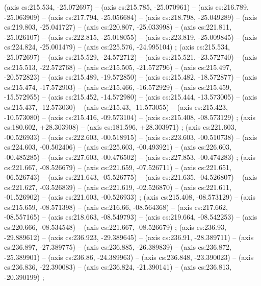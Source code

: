     (axis cs:215.534,    -25.072697) --  (axis cs:215.785,    -25.070961) --  (axis cs:216.789,    -25.063909) --  (axis cs:217.794,    -25.056684) --  (axis cs:218.798,    -25.049289) --  (axis cs:219.803,    -25.041727) --  (axis cs:220.807,    -25.033998) --  (axis cs:221.811,    -25.026107) --  (axis cs:222.815,    -25.018055) --  (axis cs:223.819,    -25.009845) --  (axis cs:224.824,    -25.001479) --  (axis cs:225.576,    -24.995104) ;
    (axis cs:215.534,    -25.072697) --  (axis cs:215.529,    -24.572712) --  (axis cs:215.521,    -23.572740) --  (axis cs:215.513,    -22.572768) --  (axis cs:215.505,    -21.572796) --  (axis cs:215.497,    -20.572823) --  (axis cs:215.489,    -19.572850) --  (axis cs:215.482,    -18.572877) --  (axis cs:215.474,    -17.572903) --  (axis cs:215.466,    -16.572929) --  (axis cs:215.459,    -15.572955) --  (axis cs:215.452,    -14.572980) --  (axis cs:215.444,    -13.573005) --  (axis cs:215.437,    -12.573030) --  (axis cs:215.43,    -11.573055) --  (axis cs:215.423,    -10.573080) --  (axis cs:215.416,    -09.573104) --  (axis cs:215.408,    -08.573129) ;
    (axis cs:180.602,    +28.303908) --  (axis cs:181.596,    +28.303971) ;
    (axis cs:221.603,    -00.526933) --  (axis cs:222.603,    -00.518915) --  (axis cs:223.603,    -00.510738) --  (axis cs:224.603,    -00.502406) --  (axis cs:225.603,    -00.493921) --  (axis cs:226.603,    -00.485285) --  (axis cs:227.603,    -00.476502) --  (axis cs:227.853,    -00.474283) ;
    (axis cs:221.667,    -08.526679) --  (axis cs:221.659,    -07.526711) --  (axis cs:221.651,    -06.526743) --  (axis cs:221.643,    -05.526775) --  (axis cs:221.635,    -04.526807) --  (axis cs:221.627,    -03.526839) --  (axis cs:221.619,    -02.526870) --  (axis cs:221.611,    -01.526902) --  (axis cs:221.603,    -00.526933) ;
    (axis cs:215.408,    -08.573129) --  (axis cs:215.659,    -08.571398) --  (axis cs:216.66,    -08.564368) --  (axis cs:217.662,    -08.557165) --  (axis cs:218.663,    -08.549793) --  (axis cs:219.664,    -08.542253) --  (axis cs:220.666,    -08.534548) --  (axis cs:221.667,    -08.526679) ;
    (axis cs:236.93,    -29.889612) --  (axis cs:236.923,    -29.389645) --  (axis cs:236.91,    -28.389711) --  (axis cs:236.897,    -27.389775) --  (axis cs:236.885,    -26.389839) --  (axis cs:236.872,    -25.389901) --  (axis cs:236.86,    -24.389963) --  (axis cs:236.848,    -23.390023) --  (axis cs:236.836,    -22.390083) --  (axis cs:236.824,    -21.390141) --  (axis cs:236.813,    -20.390199) ;

